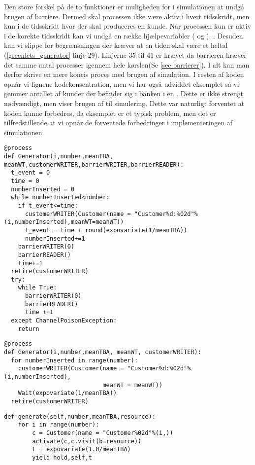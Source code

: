 Den store forskel på de to funktioner er muligheden for i simulationen  at undgå brugen af barriere. Dermed skal processen ikke være aktiv i hvert tidsskridt, men kun i de tidsskridt hvor der skal produceres en kunde. Når processen kun er aktiv i de korekte tidsskridt kan vi undgå en række hjælpevariabler ( og ). . Desuden kan vi slippe for begrænsningen der kræver at en tiden skal være et heltal (\cref{greenlets_generator} linje 29). Linjerne 35 til 41 er krævet da barrieren kræver det samme antal processer igennem hele kørslen(Se \cref{sec:barrierer}). I alt kan man derfor skrive en mere koncis proces med brugen af simulation. I resten af koden opnår vi lignene kodekonsentration, men vi har også udviddet eksemplet så vi gemmer antallet af kunder der befinder sig i banken i en . Dette er ikke strengt nødvændigt, men viser brugen af  til simulering. Dette var naturligt forventet at koden kunne forbedres, da eksemplet er et typisk \des problem, men det er tilfredstillende at vi opnår de forventede forbedringer i implementeringen af simulationen.
\begin{lstlisting}[firstnumber=21, label=greenlets_generator, caption=Generatorprocessen for Greenlets versionen]
@process
def Generator(i,number,meanTBA, meanWT,customerWRITER,barrierWRITER,barrierREADER):
  t_event = 0
  time = 0
  numberInserted = 0
  while numberInserted<number:
    if t_event<=time:
      customerWRITER(Customer(name = "Customer%d:%02d"%(i,numberInserted),meanWT=meanWT))
      t_event = time + round(expovariate(1/meanTBA))
      numberInserted+=1
    barrierWRITER(0)
    barrierREADER()
    time+=1
  retire(customerWRITER)
  try:
    while True:
      barrierWRITER(0)
      barrierREADER()
      time +=1
  except ChannelPoisonException: 
    return
\end{lstlisting}
\begin{lstlisting}[firstnumber=20, label=simulation_generator, caption=Generatorprocessen for Simulationsversionen]
@process
def Generator(i,number,meanTBA, meanWT, customerWRITER):
  for numberInserted in range(number):
    customerWRITER(Customer(name = "Customer%d:%02d"%(i,numberInserted),
                            meanWT = meanWT))
    Wait(expovariate(1/meanTBA))
  retire(customerWRITER)
\end{lstlisting}

\begin{lstlisting}[firstnumber=11, label=simpy_generator, caption=Generator funktion for simpy]
def generate(self,number,meanTBA,resource):         
    for i in range(number):
        c = Customer(name = "Customer%02d"%(i,))
        activate(c,c.visit(b=resource))              
        t = expovariate(1.0/meanTBA)               
        yield hold,self,t
\end{lstlisting}

